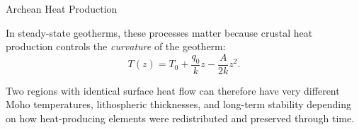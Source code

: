 \begin{activity}{Archean Heat Production}
{In steady-state geotherms, these processes matter because crustal heat production controls the \emph{curvature} of the geotherm:
\[
T(z) = T_0 + \frac{q_0}{k}z - \frac{A}{2k}z^2.
\]

Two regions with identical surface heat flow can therefore have very different Moho temperatures, lithospheric thicknesses, and long-term stability depending on how heat-producing elements were redistributed and preserved through time.
}

\end{activity}